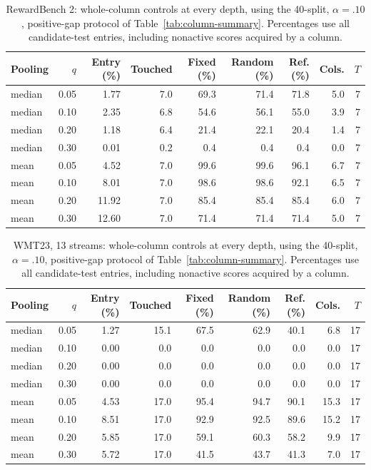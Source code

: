 \begin{table}[t]
\centering\small
\begin{tabular}{lrrrrrrrr}
\toprule
Pooling & $q$ & Entry (\%) & Touched & Fixed (\%) & Random (\%) & Ref. (\%) & Cols. & $T$ \\
\midrule
median & 0.05 & 1.77 & 7.0 & 69.3 & 71.4 & 71.8 & 5.0 & 7 \\
median & 0.10 & 2.35 & 6.8 & 54.6 & 56.1 & 55.0 & 3.9 & 7 \\
median & 0.20 & 1.18 & 6.4 & 21.4 & 22.1 & 20.4 & 1.4 & 7 \\
median & 0.30 & 0.01 & 0.2 & 0.4 & 0.4 & 0.4 & 0.0 & 7 \\
mean & 0.05 & 4.52 & 7.0 & 99.6 & 99.6 & 96.1 & 6.7 & 7 \\
mean & 0.10 & 8.01 & 7.0 & 98.6 & 98.6 & 92.1 & 6.5 & 7 \\
mean & 0.20 & 11.92 & 7.0 & 85.4 & 85.4 & 85.4 & 6.0 & 7 \\
mean & 0.30 & 12.60 & 7.0 & 71.4 & 71.4 & 71.4 & 5.0 & 7 \\
\bottomrule
\end{tabular}
\caption{RewardBench 2: whole-column controls at every depth, using the 40-split, $\alpha=.10$, positive-gap protocol of Table~\ref{tab:column-summary}. Percentages use all candidate-test entries, including nonactive scores acquired by a column.}
\label{tab:column-all-0}
\end{table}

\begin{table}[t]
\centering\small
\begin{tabular}{lrrrrrrrr}
\toprule
Pooling & $q$ & Entry (\%) & Touched & Fixed (\%) & Random (\%) & Ref. (\%) & Cols. & $T$ \\
\midrule
median & 0.05 & 1.27 & 15.1 & 67.5 & 62.9 & 40.1 & 6.8 & 17 \\
median & 0.10 & 0.00 & 0.0 & 0.0 & 0.0 & 0.0 & 0.0 & 17 \\
median & 0.20 & 0.00 & 0.0 & 0.0 & 0.0 & 0.0 & 0.0 & 17 \\
median & 0.30 & 0.00 & 0.0 & 0.0 & 0.0 & 0.0 & 0.0 & 17 \\
mean & 0.05 & 4.53 & 17.0 & 95.4 & 94.7 & 90.1 & 15.3 & 17 \\
mean & 0.10 & 8.51 & 17.0 & 92.9 & 92.5 & 89.6 & 15.2 & 17 \\
mean & 0.20 & 5.85 & 17.0 & 59.1 & 60.3 & 58.2 & 9.9 & 17 \\
mean & 0.30 & 5.72 & 17.0 & 41.5 & 43.7 & 41.3 & 7.0 & 17 \\
\bottomrule
\end{tabular}
\caption{WMT23, 13 streams: whole-column controls at every depth, using the 40-split, $\alpha=.10$, positive-gap protocol of Table~\ref{tab:column-summary}. Percentages use all candidate-test entries, including nonactive scores acquired by a column.}
\label{tab:column-all-1}
\end{table}

